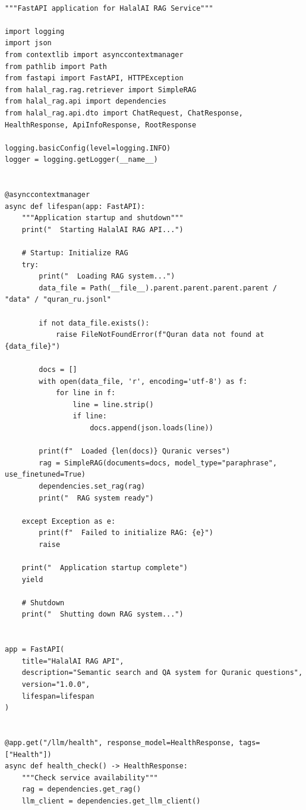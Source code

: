 \begin{lstlisting}[basicstyle=\tiny\ttfamily,breaklines=true]

"""FastAPI application for HalalAI RAG Service"""

import logging
import json
from contextlib import asynccontextmanager
from pathlib import Path
from fastapi import FastAPI, HTTPException
from halal_rag.rag.retriever import SimpleRAG
from halal_rag.api import dependencies
from halal_rag.api.dto import ChatRequest, ChatResponse, HealthResponse, ApiInfoResponse, RootResponse

logging.basicConfig(level=logging.INFO)
logger = logging.getLogger(__name__)


@asynccontextmanager
async def lifespan(app: FastAPI):
    """Application startup and shutdown"""
    print("  Starting HalalAI RAG API...")

    # Startup: Initialize RAG
    try:
        print("  Loading RAG system...")
        data_file = Path(__file__).parent.parent.parent.parent / "data" / "quran_ru.jsonl"

        if not data_file.exists():
            raise FileNotFoundError(f"Quran data not found at {data_file}")

        docs = []
        with open(data_file, 'r', encoding='utf-8') as f:
            for line in f:
                line = line.strip()
                if line:
                    docs.append(json.loads(line))

        print(f"  Loaded {len(docs)} Quranic verses")
        rag = SimpleRAG(documents=docs, model_type="paraphrase", use_finetuned=True)
        dependencies.set_rag(rag)
        print("  RAG system ready")

    except Exception as e:
        print(f"  Failed to initialize RAG: {e}")
        raise

    print("  Application startup complete")
    yield

    # Shutdown
    print("  Shutting down RAG system...")


app = FastAPI(
    title="HalalAI RAG API",
    description="Semantic search and QA system for Quranic questions",
    version="1.0.0",
    lifespan=lifespan
)


@app.get("/llm/health", response_model=HealthResponse, tags=["Health"])
async def health_check() -> HealthResponse:
    """Check service availability"""
    rag = dependencies.get_rag()
    llm_client = dependencies.get_llm_client()


\end{lstlisting}
